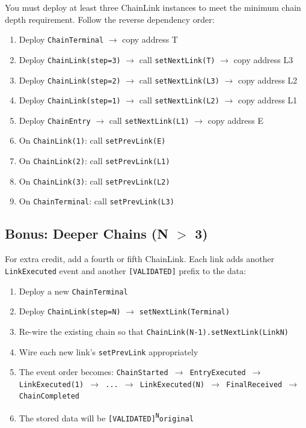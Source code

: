 \documentclass[11pt,a4paper]{article}
\begin{document}
You must deploy at least three ChainLink instances to meet the minimum chain
depth requirement. Follow the reverse dependency order:

\begin{enumerate}
    \item Deploy \texttt{ChainTerminal} $\to$ copy address T
    \item Deploy \texttt{ChainLink(step=3)} $\to$ call \texttt{setNextLink(T)} $\to$ copy address L3
    \item Deploy \texttt{ChainLink(step=2)} $\to$ call \texttt{setNextLink(L3)} $\to$ copy address L2
    \item Deploy \texttt{ChainLink(step=1)} $\to$ call \texttt{setNextLink(L2)} $\to$ copy address L1
    \item Deploy \texttt{ChainEntry} $\to$ call \texttt{setNextLink(L1)} $\to$ copy address E
    \item On \texttt{ChainLink(1)}: call \texttt{setPrevLink(E)}
    \item On \texttt{ChainLink(2)}: call \texttt{setPrevLink(L1)}
    \item On \texttt{ChainLink(3)}: call \texttt{setPrevLink(L2)}
    \item On \texttt{ChainTerminal}: call \texttt{setPrevLink(L3)}
\end{enumerate}

\subsection{Bonus: Deeper Chains (N $>$ 3)}

For extra credit, add a fourth or fifth ChainLink. Each link adds another
\texttt{LinkExecuted} event and another \texttt{[VALIDATED]} prefix to the data:

\begin{enumerate}
    \item Deploy a new \texttt{ChainTerminal}
    \item Deploy \texttt{ChainLink(step=N)} $\to$ \texttt{setNextLink(Terminal)}
    \item Re-wire the existing chain so that \texttt{ChainLink(N-1).setNextLink(LinkN)}
    \item Wire each new link's \texttt{setPrevLink} appropriately
    \item The event order becomes:
          \texttt{ChainStarted $\to$ EntryExecuted $\to$ LinkExecuted(1) $\to$ ... $\to$ LinkExecuted(N) $\to$ FinalReceived $\to$ ChainCompleted}
    \item The stored data will be \texttt{[VALIDATED]\textsuperscript{N}original}
\end{enumerate}
\end{document}
